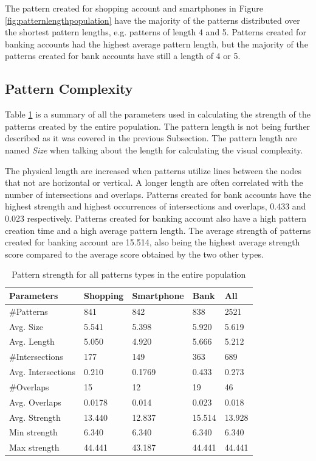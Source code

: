     \clearpage
    The pattern created for shopping account and smartphones in Figure \ref{fig:patternlengthpopulation} have the majority of the patterns distributed over the shortest pattern lengths, e.g. patterns of length 4 and 5. Patterns created for banking accounts had the highest average pattern length, but the majority of the patterns created for bank accounts have still a length of 4 or 5.

	\subsection{Pattern Complexity}
  Table \ref{tab:patternstrength} is a summary of all the parameters used in calculating the strength of the patterns created by the entire population. The pattern length is not being further described as it was covered in the previous Subsection. The pattern length are named {\it Size} when talking about the length for calculating the visual complexity. 

  The physical length are increased when patterns utilize lines between the nodes that not are horizontal or vertical. A longer length are often correlated with the number of intersections and overlaps. Patterns created for bank accounts have the highest strength and highest occurrences of intersections and overlaps, 0.433 and 0.023 respectively. Patterns created for banking account also have a high pattern creation time and a high average pattern length. The average strength of patterns created for banking account are 15.514, also being the highest average strength score compared to the average score obtained by the two other types. 

  \begin{table}[H]
    \centering
      \begin{tabular}{l || l | l | l || l}
        \hline
        {\bf Parameters} & {\bf Shopping} & {\bf Smartphone} & {\bf Bank} & {\bf All} \\ \hline
        \#Patterns & 841 & 842 & 838                  & 2521 \\
        Avg. Size & 5.541 & 5.398 & 5.920             & 5.619 \\ 
        Avg. Length & 5.050 & 4.920 & 5.666           & 5.212 \\
        \#Intersections & 177 & 149 & 363             & 689 \\
        Avg. Intersections & 0.210 & 0.1769 & 0.433   & 0.273 \\
        \#Overlaps & 15 & 12 & 19                     & 46 \\
        Avg. Overlaps & 0.0178 & 0.014 & 0.023        & 0.018 \\ \hline
        Avg. Strength & 13.440 & 12.837 & 15.514      & 13.928 \\ 
        Min strength & 6.340 & 6.340 & 6.340          & 6.340 \\
        Max strength & 44.441 & 43.187 & 44.441       & 44.441 \\ \hline
    \end{tabular}
    \caption{Pattern strength for all patterns types in the entire population}
    \label{tab:patternstrength}
  \end{table}

